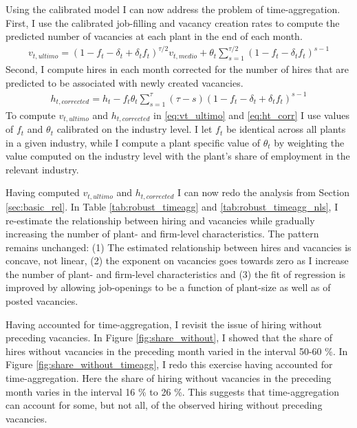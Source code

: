 Using the calibrated model I can now address the problem of time-aggregation. First, I use the calibrated job-filling and vacancy creation rates to compute the predicted number of vacancies at each plant in the end of each month. 
\begin{align}
v_{t,ultimo}=\left( 1-f_t-\delta_t+\delta_t f_t \right)^{\tau/2} v_{t,medio} + \theta_t \sum_{s=1}^{\tau/2} \left( 1-f_t-\delta_t f_t \right)^{s-1} \label{eq:vt_ultimo}
\end{align}
Second, I compute hires in each month corrected for the number of hires that are predicted to be associated with newly created vacancies. 
\begin{align}
h_{t,corrected}=h_t-f_t \theta_t \sum_{s=1}^{\tau} \left( \tau- s\right) \left( 1-f_t-\delta_t+\delta_t f_t \right)^{s-1} \label{eq:ht_corr}
\end{align}
To compute $v_{t,ultimo}$ and $h_{t,corrected}$ in \eqref{eq:vt_ultimo} and \eqref{eq:ht_corr} I use values of $f_t$ and $\theta_t$ calibrated on the industry level. I let $f_t$ be identical across all plants in a given industry, while I compute a plant specific value of $\theta_t$ by weighting the value computed on the industry level with the plant's share of employment in the relevant industry. 

Having computed $v_{t,ultimo}$ and $h_{t,corrected}$ I can now redo the analysis from Section \ref{sec:basic_rel}. In Table \ref{tab:robust_timeagg} and \ref{tab:robust_timeagg_nls}, I re-estimate the relationship between hiring and vacancies while gradually increasing the number of plant- and firm-level characteristics. The pattern remains unchanged: (1) The estimated relationship between hires and vacancies is concave, not linear, (2) the exponent on vacancies goes towards zero as I increase the number of plant- and firm-level characteristics and (3) the fit of regression is improved by allowing job-openings to be a function of plant-size as well as of posted vacancies. 

Having accounted for time-aggregation, I revisit the issue of hiring without preceding vacancies. In Figure \ref{fig:share_without}, I showed that the share of hires without vacancies in the preceding month varied in the interval 50-60 \%. In Figure \ref{fig:share_without_timeagg}, I redo this exercise having accounted for time-aggregation. Here the share of hiring without vacancies in the preceding month varies in the interval 16 \% to 26 \%. This suggests that time-aggregation can account for some, but not all, of the observed hiring without preceding vacancies.

